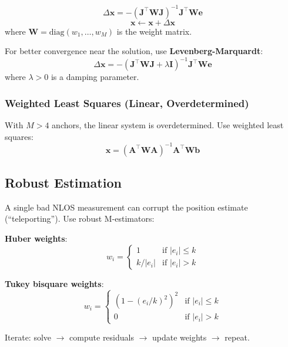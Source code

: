 \documentclass[11pt,a4paper]{article}
\begin{document}
\begin{mathbox}
\begin{equation}
    \boxed{\Delta \mathbf{x} = -(\mathbf{J}^\top \mathbf{W} \mathbf{J})^{-1} \mathbf{J}^\top \mathbf{W} \mathbf{e}}
\end{equation}
\begin{equation}
    \mathbf{x} \leftarrow \mathbf{x} + \Delta \mathbf{x}
\end{equation}
where $\mathbf{W} = \text{diag}(w_1, \dots, w_M)$ is the weight matrix.
\end{mathbox}

For better convergence near the solution, use \textbf{Levenberg-Marquardt}:
\begin{equation}
    \Delta \mathbf{x} = -(\mathbf{J}^\top \mathbf{W} \mathbf{J} + \lambda \mathbf{I})^{-1} \mathbf{J}^\top \mathbf{W} \mathbf{e}
\end{equation}
where $\lambda > 0$ is a damping parameter.

\subsubsection{Weighted Least Squares (Linear, Overdetermined)}

With $M > 4$ anchors, the linear system is overdetermined. Use weighted least squares:
\begin{equation}
    \boxed{\mathbf{x} = (\mathbf{A}^\top \mathbf{W} \mathbf{A})^{-1} \mathbf{A}^\top \mathbf{W} \mathbf{b}}
\end{equation}

\subsection{Robust Estimation}

\begin{warningbox}
A single bad NLOS measurement can corrupt the position estimate (``teleporting''). Use robust M-estimators:

\textbf{Huber weights}:
\begin{equation}
    w_i = \begin{cases}
        1 & \text{if } |e_i| \leq k \\
        k / |e_i| & \text{if } |e_i| > k
    \end{cases}
\end{equation}

\textbf{Tukey bisquare weights}:
\begin{equation}
    w_i = \begin{cases}
        \left(1 - (e_i/k)^2\right)^2 & \text{if } |e_i| \leq k \\
        0 & \text{if } |e_i| > k
    \end{cases}
\end{equation}

Iterate: solve $\rightarrow$ compute residuals $\rightarrow$ update weights $\rightarrow$ repeat.
\end{warningbox}
\end{document}
